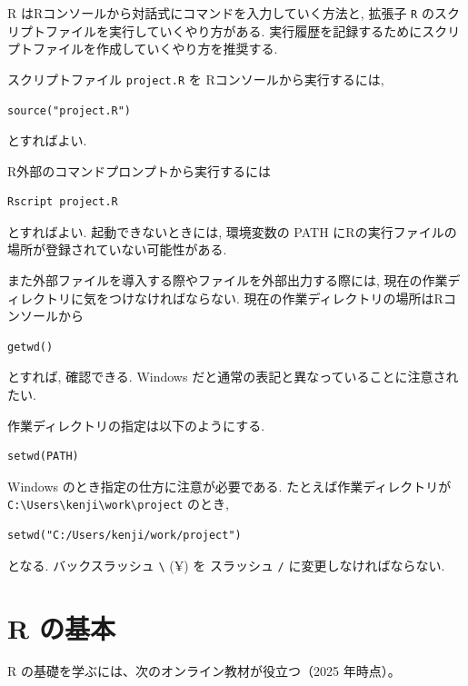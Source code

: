 \documentclass[
  letterpaper,
  xelatex,
  ja=standard, xelatex]{bxjsbook}
\begin{document}
R はRコンソールから対話式にコマンドを入力していく方法と, 拡張子
\texttt{R} のスクリプトファイルを実行していくやり方がある.
実行履歴を記録するためにスクリプトファイルを作成していくやり方を推奨する.

スクリプトファイル \texttt{project.R} を Rコンソールから実行するには,

\begin{verbatim}
source("project.R")
\end{verbatim}

とすればよい.

R外部のコマンドプロンプトから実行するには

\begin{verbatim}
Rscript project.R
\end{verbatim}

とすればよい. 起動できないときには, 環境変数の PATH
にRの実行ファイルの場所が登録されていない可能性がある.

また外部ファイルを導入する際やファイルを外部出力する際には,
現在の作業ディレクトリに気をつけなければならない.
現在の作業ディレクトリの場所はRコンソールから

\begin{verbatim}
getwd()
\end{verbatim}

とすれば, 確認できる. Windows
だと通常の表記と異なっていることに注意されたい.

作業ディレクトリの指定は以下のようにする.

\begin{verbatim}
setwd(PATH)
\end{verbatim}

Windows のとき指定の仕方に注意が必要である. たとえば作業ディレクトリが
\texttt{C:\textbackslash{}Users\textbackslash{}kenji\textbackslash{}work\textbackslash{}project}
のとき,

\begin{verbatim}
setwd("C:/Users/kenji/work/project")
\end{verbatim}

となる. バックスラッシュ \texttt{\textbackslash{}} (\(\yen\)) を
スラッシュ \texttt{/} に変更しなければならない.


\chapter{R の基本}\label{r-ux306eux57faux672c}

R の基礎を学ぶには、次のオンライン教材が役立つ（2025 年時点）。
\end{document}
